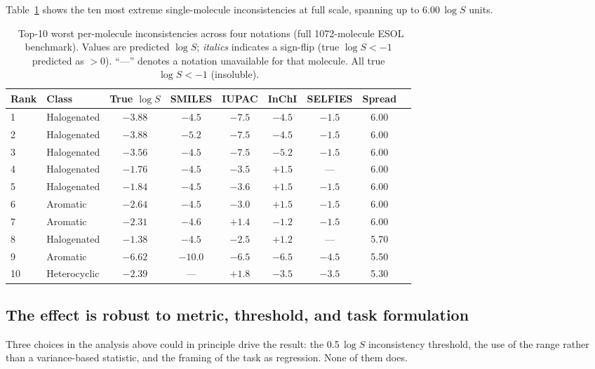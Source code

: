 \documentclass[twoside,twocolumn,9pt]{article}
\newcommand{\logS}{\ensuremath{\log S}}
\begin{document}
Table~\ref{tbl:top10} shows the ten most extreme single-molecule inconsistencies at full scale, spanning up to 6.00\,$\logS$ units.

\begin{table}
\small
\caption{\ Top-10 worst per-molecule inconsistencies across four notations (full 1072-molecule ESOL benchmark). Values are predicted $\logS$; \textit{italics} indicates a sign-flip (true $\logS < -1$ predicted as $>0$). ``---'' denotes a notation unavailable for that molecule. All true $\logS < -1$ (insoluble).}
\label{tbl:top10}
\begin{tabular*}{\textwidth}{@{\extracolsep{\fill}}llccccccc}
\hline
Rank & Class & True $\logS$ & SMILES & IUPAC & InChI & SELFIES & Spread \\
\hline
1  & Halogenated & $-3.88$ & $-4.5$ & $-7.5$ & $-4.5$ & $-1.5$ & 6.00 \\
2  & Halogenated & $-3.88$ & $-5.2$ & $-7.5$ & $-4.5$ & $-1.5$ & 6.00 \\
3  & Halogenated & $-3.56$ & $-4.5$ & $-7.5$ & $-5.2$ & $-1.5$ & 6.00 \\
4  & Halogenated & $-1.76$ & $-4.5$ & $-3.5$ & \textit{$+1.5$} & --- & 6.00 \\
5  & Halogenated & $-1.84$ & $-4.5$ & $-3.6$ & \textit{$+1.5$} & $-1.5$ & 6.00 \\
6  & Aromatic    & $-2.64$ & $-4.5$ & $-3.0$ & \textit{$+1.5$} & $-1.5$ & 6.00 \\
7  & Aromatic    & $-2.31$ & $-4.6$ & \textit{$+1.4$} & $-1.2$ & $-1.5$ & 6.00 \\
8  & Halogenated & $-1.38$ & $-4.5$ & $-2.5$ & \textit{$+1.2$} & --- & 5.70 \\
9  & Aromatic    & $-6.62$ & $-10.0$ & $-6.5$ & $-6.5$ & $-4.5$ & 5.50 \\
10 & Heterocyclic& $-2.39$ & --- & \textit{$+1.8$} & $-3.5$ & $-3.5$ & 5.30 \\
\hline
\end{tabular*}
\end{table}

\subsection{The effect is robust to metric, threshold, and task formulation}
\label{sec:robust}

Three choices in the analysis above could in principle drive the result: the 0.5\,$\logS$ inconsistency threshold, the use of the range rather than a variance-based statistic, and the framing of the task as regression. None of them does.
\end{document}
